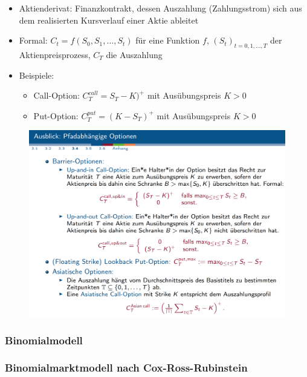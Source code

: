 \documentclass[12pt]{report}
\theoremstyle{dotless}
\theoremstyle{definition}
\begin{document}
\begin{itemize}
	\item Aktienderivat: Finanzkontrakt, dessen Auszahlung (Zahlungsstrom) sich aus dem realisierten Kursverlauf einer Aktie ableitet
	\item Formal: $C_t = f(S_0,S_1,...,S_t)$ f\"ur eine Funktion $f$, $(S_t)_{t=0,1,...,T}$ der Aktienpreisprozess, $C_T$ die Auszahlung
	\item Beispiele:
	\begin{itemize}
		\item Call-Option: $C_T^{call} = S_T-K)^+$ mit Aus\"ubungspreis $K>0$
		\item Put-Option: $C_T^{put} = (K-S_T)^+$ mit Aus\"ubungspreis $K>0$
	\end{itemize}
\end{itemize}

\begin{figure}[H]
\centering
\includegraphics[width=\textwidth]{Bilder/AusblickOptionen.png}
\end{figure}

\subsubsection{Binomialmodell}

\subsubsection{Binomialmarktmodell nach Cox-Ross-Rubinstein}
\end{document}
